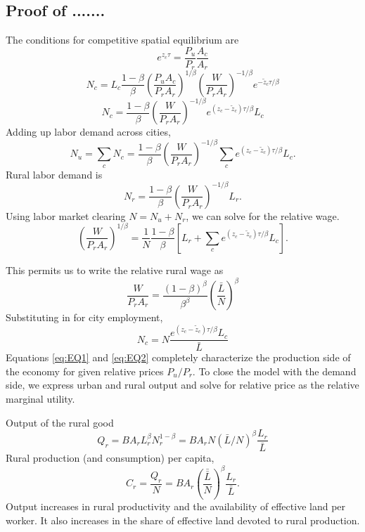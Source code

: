 \documentclass[12pt]{article}
\begin{document}
\subsection{Proof of .......}
The conditions for competitive spatial equilibrium are
\begin{equation}\tag{i}\label{eq:EQ1}
e^{z_{c} \tau} =
\frac{P_u}{P_r}
\frac {A_c}{A_r}
\end{equation}
\[
	N_c = L_c
\frac{1-\beta}{\beta}
	 \left(\frac{P_uA_c}{P_rA_r}\right)^{1/\beta}
	 \left(\frac{W}{P_rA_r}\right)^{-1/\beta}
	 e^{-\tilde z_c{\tau/\beta}}
\]
\[
	N_c = 
\frac{1-\beta}{\beta}
	 \left(\frac{W}{P_rA_r}\right)^{-1/\beta}
	 e^{(z_c-\tilde z_c){\tau/\beta}}L_c
\]
Adding up labor demand across cities,
\[
N_u = \sum_c N_c
=
\frac{1-\beta}{\beta}
	 \left(\frac{W}{P_rA_r}\right)^{-1/\beta}
\sum_c e^{(z_c-\tilde z_c){\tau/\beta}}L_c.
\]
Rural labor demand is
\[
N_r =
\frac{1-\beta}{\beta}
	 \left(\frac{W}{P_rA_r}\right)^{-1/\beta}L_r.
\]
Using labor market clearing $N=N_u+N_r$, we can solve for the relative wage.
\[
\left(\frac{W}{P_rA_r}\right)^{1/\beta}
= \frac{1}{N}
	\frac{1-\beta}{\beta}
\left[
	L_r+
	\sum_c e^{(z_c-\tilde z_c){\tau/\beta}}L_c
\right].
\]


This permits us to write the relative rural wage as
\[
\frac{W}{P_rA_r}
=
	\frac{(1-\beta)^\beta}{\beta^\beta}
\left(
\frac {\bar L}{N}
\right)^{\beta}
\]
Substituting in for city employment,
\begin{equation}\tag{ii}\label{eq:EQ2}
	N_c =  N
\frac {e^{(z_c-\tilde z_c){\tau/\beta}}L_c}
	{{\bar L}}
\end{equation}
Equations \eqref{eq:EQ1} and \eqref{eq:EQ2} completely characterize the production side of the economy for given relative prices $P_u/P_r$. To close the model with the demand side, we express urban and rural output and solve for relative price as the relative marginal utility.

Output of the rural good
\[
Q_r = B A_r L_r^{\beta}N_r^{1-\beta}=
B A_r N ({\bar L}/N)^{\beta}
\frac {L_r}
	{{\bar L}}
\]
Rural production (and consumption) per capita,
\begin{equation}\label{eq:rural_per_capita}
C_r=\frac {Q_r}{N} =
B A_r \left(\frac{\bar{\bar L}}{N}\right)^{\beta}
\frac {L_r}
	{{\bar L}}
.
\end{equation}
Output increases in rural productivity and the availability of effective land per worker. It also increases in the share of effective land devoted to rural production.
\end{document}
